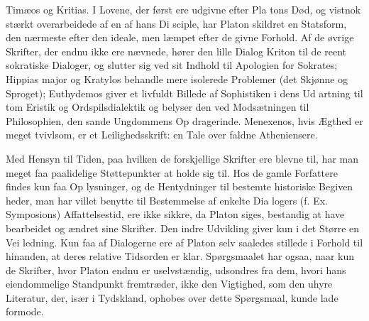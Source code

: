 \documentclass[12pt,a4paper]{book}
\newcommand{\gk}[1]{\textit{#1}}
\begin{document}
Timæos og Kritias. I Lovene, der først ere udgivne efter Pla\-%
tons Død, og vistnok stærkt overarbeidede af en af hans Di\-%
sciple, har Platon skildret en Statsform, den nærmeste efter
den ideale, men læmpet efter de givne Forhold. Af de øvrige
Skrifter, der endnu ikke ere nævnede, hører den lille Dialog
Kriton til de reent sokratiske Dialoger, og slutter sig ved sit
Indhold til Apologien for Sokrates; Hippias major og Kratylos
behandle mere isolerede Problemer (det Skjønne og Sproget);
Euthydemos giver et livfuldt Billede af Sophistiken i dens Ud\-%
artning til tom Eristik og Ordspilsdialektik og belyser den ved
Modsætningen til Philosophien, den sande Ungdommens Op\-%
dragerinde. Menexenos, hvis Ægthed er meget tvivlsom, er
et Leilighedsskrift: en Tale over faldne Atheniensere.

Med Hensyn til Tiden, paa hvilken de forskjellige Skrifter
ere blevne til, har man meget faa paalidelige Støttepunkter
at holde sig til. Hos de gamle Forfattere findes kun faa Op\-%
lysninger, og de Hentydninger til bestemte historiske Begiven\-%
heder, man har villet benytte til Bestemmelse af enkelte Dia\-%
logers (f. Ex. Symposions) Affattelsestid, ere ikke sikkre, da
Platon siges, bestandig at have bearbeidet og ændret sine
Skrifter. Den indre Udvikling giver kun i det Større en Vei\-%
ledning. Kun faa af Dialogerne ere af Platon selv saaledes
stillede i Forhold til hinanden, at deres relative Tidsorden er
klar. Spørgsmaalet har ogsaa, naar kun de Skrifter, hvor
Platon endnu er uselvstændig, udsondres fra dem, hvori hans
eiendommelige Standpunkt fremtræder, ikke den Vigtighed,
som den uhyre Literatur, der, især i Tydskland, ophobes over
dette Spørgsmaal, kunde lade formode.
\end{document}

